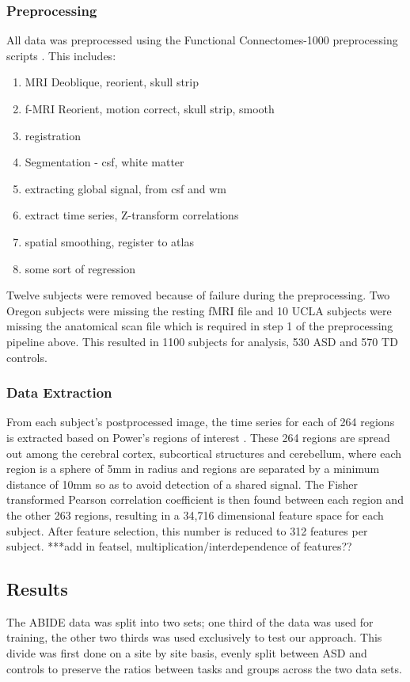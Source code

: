 \documentclass{llncs}
\begin{document}
\subsubsection{Preprocessing}
All data was preprocessed using the Functional Connectomes-1000 preprocessing scripts \cite{fcon}. This includes:
\begin{enumerate}
\item MRI Deoblique, reorient, skull strip
\item f-MRI Reorient, motion correct, skull strip, smooth
\item registration
\item Segmentation - csf, white matter
\item extracting global signal, from csf and wm
\item extract time series, Z-transform correlations
\item spatial smoothing, register to atlas
\item some sort of regression
\end{enumerate}
Twelve subjects were removed because of failure during the preprocessing.  Two Oregon subjects were missing the resting fMRI file and 10 UCLA subjects were missing the anatomical scan file which is required in step 1 of the preprocessing pipeline above. This resulted in 1100 subjects for analysis, 530 ASD and 570 TD controls.
\subsubsection{Data Extraction}
From each subject's postprocessed image, the time series for each of 264 regions is extracted based on Power's regions of interest \cite{Powers}. These 264 regions are spread out among the cerebral cortex, subcortical structures and cerebellum, where each region is a sphere of 5mm in radius and regions are separated by a minimum distance of 10mm so as to avoid detection of a shared signal. The Fisher transformed Pearson correlation coefficient is then found between each region and the other 263 regions, resulting in a 34,716 dimensional feature space for each subject. After feature selection, this number is reduced to 312 features per subject.
***add in featsel, multiplication/interdependence of features??
\subsection{Results}
The ABIDE data was split into two sets; one third of the data was used for training, the other two thirds was used exclusively to test our approach.  This divide was first done on a site by site basis, evenly split between ASD and controls to preserve the ratios between tasks and groups across the two data sets.
\end{document}
